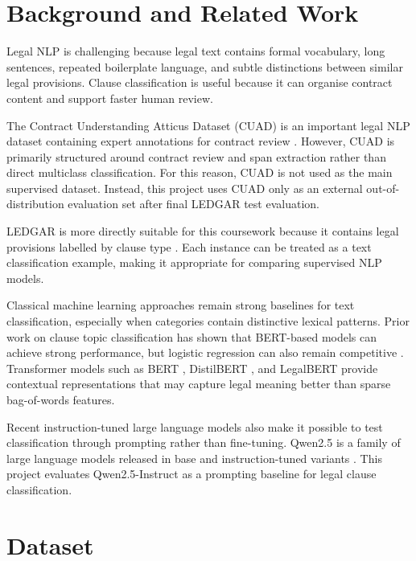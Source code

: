 \documentclass[11pt]{article}
\begin{document}
\section{Background and Related Work}

Legal NLP is challenging because legal text contains formal vocabulary, long sentences, repeated boilerplate language, and subtle distinctions between similar legal provisions. Clause classification is useful because it can organise contract content and support faster human review.

The Contract Understanding Atticus Dataset (CUAD) is an important legal NLP dataset containing expert annotations for contract review \citep{hendrycks2021cuad}. However, CUAD is primarily structured around contract review and span extraction rather than direct multiclass classification. For this reason, CUAD is not used as the main supervised dataset. Instead, this project uses CUAD only as an external out-of-distribution evaluation set after final LEDGAR test evaluation.

LEDGAR is more directly suitable for this coursework because it contains legal provisions labelled by clause type \citep{tuggener2020ledgar}. Each instance can be treated as a text classification example, making it appropriate for comparing supervised NLP models.

Classical machine learning approaches remain strong baselines for text classification, especially when categories contain distinctive lexical patterns. Prior work on clause topic classification has shown that BERT-based models can achieve strong performance, but logistic regression can also remain competitive \citep{braun2022clause}. Transformer models such as BERT \citep{devlin2019bert}, DistilBERT \citep{sanh2019distilbert}, and LegalBERT \citep{chalkidis2020legalbert} provide contextual representations that may capture legal meaning better than sparse bag-of-words features.

Recent instruction-tuned large language models also make it possible to test classification through prompting rather than fine-tuning. Qwen2.5 is a family of large language models released in base and instruction-tuned variants \citep{yang2025qwen25}. This project evaluates Qwen2.5-Instruct as a prompting baseline for legal clause classification.

\section{Dataset}
\end{document}
